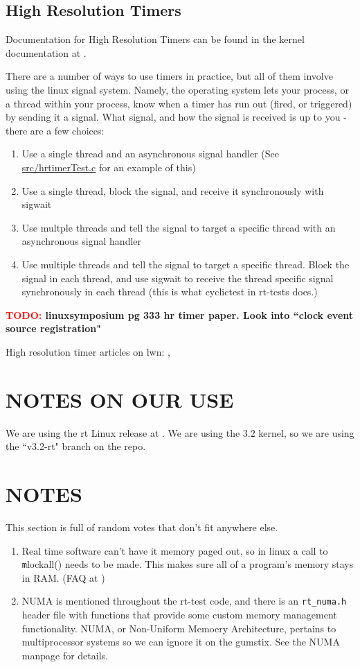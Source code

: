 \documentclass{article}
\newcommand{\TODO}[1]{ {\bf \textcolor{red}{TODO:} #1 }}
\begin{document}
\subsection{High Resolution Timers}
Documentation for High Resolution Timers can be found in the kernel documentation at \cite{highResTimerDoc}.

There are a number of ways to use timers in practice, but all of them involve using the linux signal system. Namely, the operating system lets your process, or a thread within your process, know when a timer has run out (fired, or triggered) by sending it a signal.  What signal, and how the signal is received is up to you - there are a few choices:
\begin{enumerate}
\item Use a single thread and an asynchronous signal handler (See \href{https://github.com/ianohara/rt-linux-examples/blob/master/src/hrtimerTest.c}{src/hrtimerTest.c} for an example of this)
\item Use a single thread, block the signal, and receive it synchronously with sigwait
\item Use multple threads and tell the signal to target a specific thread with an asynchronous signal handler
\item Use multiple threads and tell the signal to target a specific thread.  Block the signal in each thread, and use sigwait to receive the thread specific signal synchronously in each thread (this is what cyclictest in rt-tests does.)
\end{enumerate}

\TODO{linuxsymposium pg 333 hr timer paper.  Look into ``clock event source registration"}

High resolution timer articles on lwn: \cite{highResTimerAPI}, \cite{newApproachToKernelTimers}

\section{NOTES ON OUR USE}
We are using the rt Linux release at \cite{RealTimeLinuxPatch}.  We are using the 3.2 kernel, so we are using the ``v3.2-rt" branch on the repo.

\section{NOTES}
This section is full of random votes that don't fit anywhere else.
\begin{enumerate}
\item Real time software can't have it memory paged out, so in linux a call to {\texttt mlockall()} needs to be made.  This makes sure all of a program's memory stays in RAM. (FAQ at \cite{RealTimeLinux})
\item NUMA is mentioned throughout the rt-test code, and there is an \texttt{rt\_numa.h} header file with functions that provide some custom memory management functionality.  NUMA, or Non-Uniform Memoery Architecture, pertains to multiprocessor systems so we can ignore it on the gumstix.  See the NUMA manpage \cite{NUMA} for details.
\end{enumerate}

\end{document}
